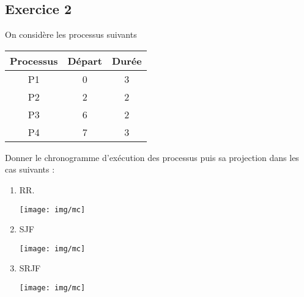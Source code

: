 \documentclass[a4paper,12pt,french]{article}
\begin{document}
\subsection*{Exercice 2}

On considère les processus suivants
\begin{center}
\begin{tabular}{|c|c|c|}
\hline\rowcolor{UGLiOrange}
\textbf{\color{white} Processus} & \textbf{\color{white}Départ} & \textbf{\color{white}Durée} \\
\hline
P1 & 0 & 3 \\
\hline
P2 & 2 & 2 \\
\hline
P3 & 6 & 2 \\
\hline
P4 & 7 & 3 \\
\hline
\end{tabular}
\end{center}
Donner le chronogramme d'exécution des processus puis sa projection dans les cas suivants :
\begin{enumerate}
	\item 	RR.
    \begin{center}
                     \texttt{[image: img/mc]}\\
                     \end{center}
    \newpage
    
	\item 	SJF
    \begin{center}
                     \texttt{[image: img/mc]}\\
                     \end{center}
    \item SRJF
    \begin{center}
                     \texttt{[image: img/mc]}\\
                     \end{center}
    \end{enumerate}
\end{document}
